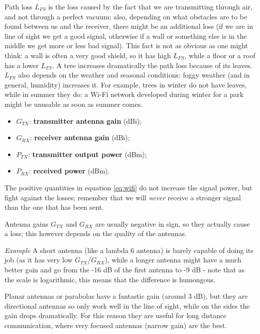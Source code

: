 Path loss $L_{FS}$ is the loss caused by the fact that we are transmitting through air, and not through a perfect vacuum; also, depending on what obstacles are to be found between us and the receiver, there might be an additional loss (if we are in line of sight we get a good signal, otherwise if a wall or something else is in the middle we get more or less bad signal). This fact is not as obvious as one might think: a wall is often a very good shield, so it has high $L_{FS}$, while a floor or a roof has a lower $L_{FS}$. A tree increases dramatically the path loss because of its leaves. $L_{FS}$ also depends on the weather and seasonal conditions: foggy weather (and in general, humidity) increases it. For example, trees in winter do not have leaves, while in summer they do: a Wi-Fi network developed during winter for a park might be unusable as soon as summer comes.

\begin{itemize}
    \item \textbf{$G_{TX}$}: \textbf{transmitter antenna gain} (dBi);
    \item \textbf{$G_{RX}$}: \textbf{receiver antenna gain} (dBi);
    \item \textbf{$P_{TX}$}: \textbf{transmitter output power} (dBm);
    \item \textbf{$P_{RX}$}: \textbf{received power} (dBm).
\end{itemize}

The positive quantities in equation \ref{eq:wifi} do not increase the signal power, but fight against the losses; remember that we will \textit{never} receive a stronger signal than the one that has been sent.

Antenna gains $G_{TX}$ and $G_{RX}$ are usually negative in sign, so they actually cause a loss; this however depends on the quality of the antennas.

\vspace{0.5em}

\emph{Example} A short antenna (like a lambda 6 antenna) is barely capable of doing its job (as it has very low $G_{TX}$/$G_{RX}$), while a longer antenna might have a much better gain and go from the -16 dB of the first antenna to -9 dB - note that as the scale is logarithmic, this means that the difference is humongous.

Planar antennas or parabolas have a fantastic gain (around 3 dB), but they are directional antennas so only work well in the line of sight, while on the sides the gain drops dramatically. For this reason they are useful for long distance communication, where very focused antennas (narrow gain) are the best.

